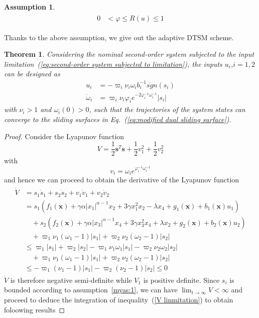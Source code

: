 \documentclass[3p]{elsarticle}
\theoremstyle{plain}
\newtheorem{myas}{Assumption}
\newtheorem{mythm}{Theorem}
\theoremstyle{remark}
\begin{document}
{\begin{myas}
\begin{align}
\begin{split}
  0&<\varphi\le R(u) \le 1
\end{split}\end{align}
\end{myas}
Thanks to the above assumption, we give out the adaptive DTSM scheme.
\begin{mythm}\label{thm:4}
Considering the nominal second-order system subjected to the input limitation~(\ref{eq:second-order system subjected to limitation}), the inputs $u_i$,$i=1,2$ can be designed as
\begin{align}
  u_i &= -\varpi_i\nu_i\omega_i b_i^{-1}sgn(s_i)\\
  \dot\omega_i&= \varpi_i\nu_i\varphi_i e^{-2\varphi_i^{-1}\omega_i^{-1}}\vert s_i\vert
\end{align}
with $\nu_i>1$ and $\omega_i(0)>0$, such that the trajectories of the system states can converge to the sliding surfaces in Eq.~(\ref{eq:modified dual sliding surface}).
\end{mythm}
\begin{proof}
Consider the Lyapunov function
$$V=\frac{1}{2}\bm s^T\bm s+\frac{1}{2}v_1^2+\frac{1}{2}v_2^2$$
with
$$v_i = \omega_ie^{\varphi_i^{-1}\omega_i^{-1}}$$
and hence we can proceed to obtain the derivative of the Lyapunov function
\begin{align}\begin{split}
\dot V &=s_1\dot s_1+s_2\dot s_2+v_1\dot v_1+v_2\dot v_2\\
&=s_1(f_1(\bm x)+\gamma\alpha\vert x_1\vert^{\alpha-1}x_2+3\gamma x_1^2x_2-\lambda x_4+g_1(\bm x)+b_1(\bm x)u_1)\\
&\quad +s_2(f_2(\bm x)+\gamma\alpha\vert x_3\vert^{\alpha-1}x_4+3\gamma x_3^2x_4+\lambda x_2+g_2(\bm x)+b_2(\bm x)u_2)\\
&\quad+\varpi_1\nu_1(\omega_1-1)\vert s_1\vert+\varpi_2\nu_2(\omega_2-1)\vert s_2\vert\\
&\le \varpi_1\vert s_1\vert+\varpi_2\vert s_2\vert-\varpi_1\nu_1\omega_1\vert s_1\vert-\varpi_2\nu_2\omega_2\vert s_2\vert\\
&\quad + \varpi_1\nu_1(\omega_1-1)\vert s_1\vert+\varpi_2\nu_2(\omega_2-1)\vert s_2\vert\\
&\le -\varpi_1(\nu_1-1)\vert s_1\vert-\varpi_2(\nu_2-1)\vert s_2\vert\le 0
\end{split}\end{align}\label{V linmitation}
$\dot V$ is therefore negative semi-deﬁnite while $V_1$ is positive deﬁnite. Since  $s_i$ is bounded according to assumption~\ref{myas:1}, we can have $\lim_{t\to\infty}V<\infty$ and proceed to deduce the integration of inequality~(\ref{V linmitation}) to obtain foloowing results

\end{proof}}
\end{document}
